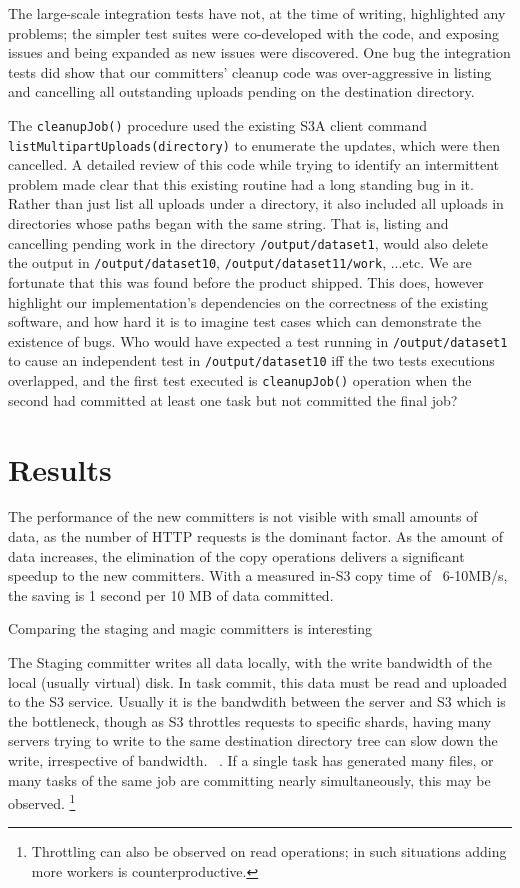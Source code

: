 \documentclass[conference]{IEEEtran}
\begin{document}
The large-scale integration tests have not, at the time of writing, highlighted any problems;
the simpler test suites were co-developed with the code, and exposing issues and
being expanded as new issues were discovered.
One bug the integration tests did show that our committers' cleanup code was
over-aggressive in listing and cancelling all outstanding uploads pending
on the destination directory.

The \texttt{cleanupJob()} procedure used the existing S3A client command
\texttt{listMultipartUploads(directory)} to enumerate the updates,
which were then cancelled.
A detailed review of this code while trying to identify an intermittent problem
made clear that this existing routine had a long standing bug in it.
Rather than just list all uploads under a directory, it also included
all uploads in directories whose paths began with the same string.
That is, listing and cancelling pending work in the directory \texttt{/output/dataset1},
would also delete the output in \texttt{/output/dataset10}, \texttt{/output/dataset11/work},
...etc.
We are fortunate that this was found before the product shipped.
This does, however highlight our implementation's dependencies on the correctness
of the existing software, and how hard it is to imagine test cases which
can demonstrate the existence of bugs.
Who would have expected a test running in \texttt{/output/dataset1} to
cause an independent test in \texttt{/output/dataset10} iff the two tests
executions overlapped, and the first test executed is \texttt{cleanupJob()}
operation when the second had committed at least one task but not committed
the final job?



\section{Results}
\label{sec:results}


The performance of the new committers is not visible with small amounts
of data, as the number of HTTP requests is the dominant factor.
As the amount of data increases, the elimination of the copy operations
delivers a significant speedup to the new committers.
With a measured in-S3 copy time of ~6-10MB/s, the saving is 1 second per 10 MB
of data committed.

Comparing the staging and magic committers is interesting

The Staging committer writes all data locally, with the write bandwidth
of the local (usually virtual) disk.
In task commit, this data must be read and uploaded to the S3 service.
Usually it is the bandwdith between the server and S3 which is the bottleneck,
though as S3 throttles requests to specific shards, having many servers trying
to write to the same destination directory tree can slow down the write, irrespective
of bandwidth.
\ \cite{AWS-S3-throttling}.
If a single task has generated many files, or many tasks of the same job are
committing nearly simultaneously, this may be observed.
\footnote{Throttling can also be observed on read operations;
in such situations adding more workers is counterproductive.}
\end{document}
